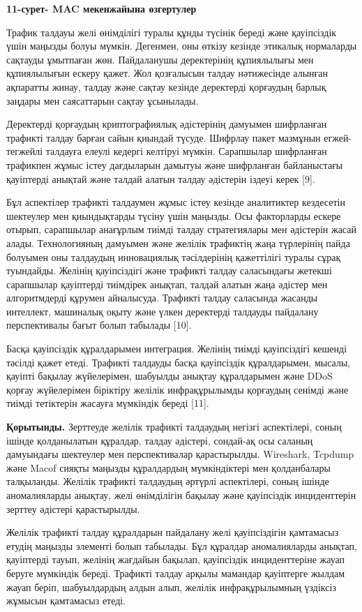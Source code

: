 {\bfseries 11-сурет- MAC мекенжайына өзгертулер}

Трафик талдауы желі өнімділігі туралы құнды түсінік береді және
қауіпсіздік үшін маңызды болуы мүмкін. Дегенмен, оны өткізу кезінде
этикалық нормаларды сақтауды ұмытпаған жөн. Пайдаланушы деректерінің
құпиялылығы мен құпиялылығын ескеру қажет. Жол қозғалысын талдау
нәтижесінде алынған ақпаратты жинау, талдау және сақтау кезінде
деректерді қорғаудың барлық заңдары мен саясаттарын сақтау ұсынылады.

Деректерді қорғаудың криптографиялық әдістерінің дамуымен шифрланған
трафикті талдау барған сайын қиындай түсуде. Шифрлау пакет мазмұнын
егжей-тегжейлі талдауға елеулі кедергі келтіруі мүмкін. Сарапшылар
шифрланған трафикпен жұмыс істеу дағдыларын дамытуы және шифрланған
байланыстағы қауіптерді анықтай және талдай алатын талдау әдістерін
іздеуі керек {[}9{]}.

Бұл аспектілер трафикті талдаумен жұмыс істеу кезінде аналитиктер
кездесетін шектеулер мен қиындықтарды түсіну үшін маңызды. Осы
факторларды ескере отырып, сарапшылар анағұрлым тиімді талдау
стратегиялары мен әдістерін жасай алады. Технологияның дамуымен және
желілік трафиктің жаңа түрлерінің пайда болуымен оны талдаудың
инновациялық тәсілдерінің қажеттілігі туралы сұрақ туындайды. Желінің
қауіпсіздігі және трафикті талдау саласындағы жетекші сарапшылар
қауіптерді тиімдірек анықтап, талдай алатын жаңа әдістер мен
алгоритмдерді құрумен айналысуда. Трафикті талдау саласында жасанды
интеллект, машиналық оқыту және үлкен деректерді талдауды пайдалану
перспективалы бағыт болып табылады {[}10{]}.

Басқа қауіпсіздік құралдарымен интеграция. Желінің тиімді қауіпсіздігі
кешенді тәсілді қажет етеді. Трафикті талдауды басқа қауіпсіздік
құралдарымен, мысалы, қауіпті бақылау жүйелерімен, шабуылды анықтау
құралдарымен және DDoS қорғау жүйелерімен біріктіру желілік
инфрақұрылымды қорғаудың сенімді және тиімді тетіктерін жасауға
мүмкіндік береді {[}11{]}.

{\bfseries Қорытынды.} Зерттеуде желілік трафикті талдаудың негізгі
аспектілері, соның ішінде қолданылатын құралдар, талдау әдістері,
сондай-ақ осы саланың дамуындағы шектеулер мен перспективалар
қарастырылды. Wireshark, Tcpdump және Macof сияқты маңызды құралдардың
мүмкіндіктері мен қолданбалары талқыланды. Желілік трафикті талдаудың
әртүрлі аспектілері, соның ішінде аномалияларды анықтау, желі
өнімділігін бақылау және қауіпсіздік инциденттерін зерттеу әдістері
қарастырылды.

Желілік трафикті талдау құралдарын пайдалану желі қауіпсіздігін
қамтамасыз етудің маңызды элементі болып табылады. Бұл құралдар
аномалияларды анықтап, қауіптерді тауып, желінің жағдайын бақылап,
қауіпсіздік инциденттеріне жауап беруге мүмкіндік береді. Трафикті
талдау арқылы мамандар қауіптерге жылдам жауап беріп, шабуылдардың алдын
алып, желілік инфрақұрылымның үздіксіз жұмысын қамтамасыз етеді.

